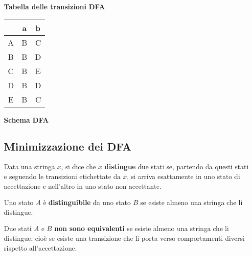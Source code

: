 \vspace{0.5cm}
\begin{minipage}{0.45\textwidth}
  \textbf{Tabella delle transizioni DFA}
  
  \begin{tabular}{c|c|c}
   & a & b \\
  \hline
  A & B & C \\
  B & B & D \\
  C & B & E \\
  D & B & D \\
  E & B & C \\
  \end{tabular}
  \end{minipage}
  \hfill
  \begin{minipage}{0.52\textwidth}
  \textbf{Schema DFA}
  
  \end{minipage}
  
  \subsection{Minimizzazione dei DFA}
  \vspace{0.7em}
  Data una stringa $x$, si dice che $x$ \textbf{distingue} due stati se, partendo da questi stati e seguendo le transizioni etichettate da $x$, si arriva esattamente in uno stato di accettazione e nell'altro in uno stato non accettante.
  
  \vspace{0.7em}
  Uno stato $A$ è \textbf{distinguibile} da uno stato $B$ se esiste almeno una stringa che li distingue.
  
  \vspace{0.7em}
  Due stati $A$ e $B$ \textbf{non sono equivalenti} se esiste almeno una stringa che li distingue, cioè se esiste una transizione che li porta verso comportamenti diversi rispetto all'accettazione.
  
